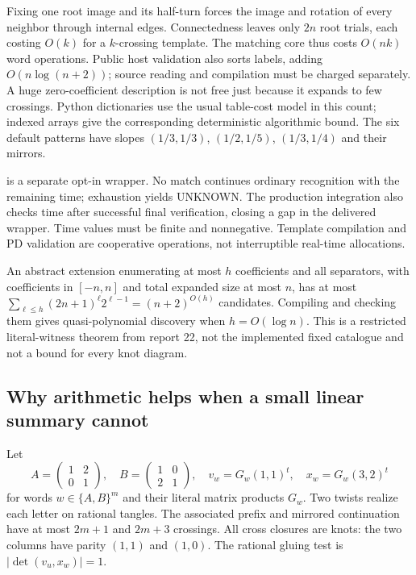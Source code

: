 Fixing one root image and its half-turn forces the image and rotation of
every neighbor through internal edges.  Connectedness leaves only $2n$
root trials, each costing $O(k)$ for a $k$-crossing template.  The matching
core thus costs $O(nk)$ word operations.  Public host validation also sorts
labels, adding $O(n\log(n+2))$; source reading and compilation must be charged
separately.  A huge zero-coefficient description is not free just because
it expands to few crossings.  Python dictionaries use the usual table-cost
model in this count; indexed arrays give the corresponding deterministic
algorithmic bound.  The six default patterns have slopes $(1/3,1/3)$,
$(1/2,1/5)$, $(1/3,1/4)$ and their mirrors.

 is a separate opt-in wrapper.  No match
continues ordinary recognition with the remaining time; exhaustion yields
UNKNOWN.  The production integration also checks time after successful final
verification, closing a gap in the delivered wrapper.  Time values must be
finite and nonnegative.  Template compilation and PD validation are cooperative
operations, not interruptible real-time allocations.

An abstract extension enumerating at most $h$ coefficients and all separators,
with coefficients in $[-n,n]$ and total expanded size at most $n$, has at most
$\sum_{\ell\le h}(2n+1)^\ell2^{\ell-1}=(n+2)^{O(h)}$ candidates.
Compiling and checking them gives quasi-polynomial discovery when
$h=O(\log n)$.  This is a restricted literal-witness theorem from report 22,
not the implemented fixed catalogue and not a bound for every knot diagram.

\subsection{Why arithmetic helps when a small linear summary cannot}
Let
\[
 A=\begin{pmatrix}1&2\\0&1\end{pmatrix},\quad
 B=\begin{pmatrix}1&0\\2&1\end{pmatrix},\quad
 v_w=G_w(1,1)^t,\quad x_w=G_w(3,2)^t
\]
for words $w\in\{A,B\}^m$ and their literal matrix products $G_w$.
Two twists realize each letter on rational tangles.  The associated
prefix and mirrored continuation have at most $2m+1$ and $2m+3$ crossings.
All cross closures are knots: the two columns have parity $(1,1)$ and
$(1,0)$.  The rational gluing test is $|\det(v_u,x_w)|=1$.


